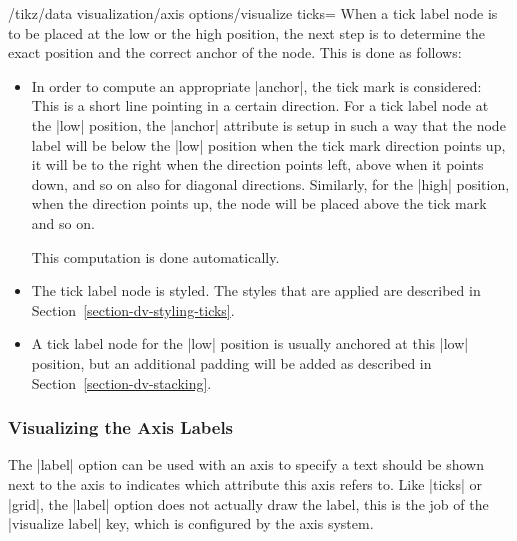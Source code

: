 \begin{key}{/tikz/data visualization/axis options/visualize ticks=}
    When a tick label node is to be placed at the low or the high position, the next step is to determine the exact position and the correct anchor of the node. This is done as follows:
    \begin{itemize}
        \item In order to compute an appropriate |anchor|, the tick mark is considered: This is a short line pointing in a certain direction. For a tick label node at the |low| position, the |anchor| attribute is setup in such a way that the node label will be below the |low| position when the tick mark direction points up, it will be to the right when the direction points left, above when it points down, and so on also for diagonal directions. Similarly, for the |high| position, when the direction points up, the node will be placed above the tick mark and so on.

            This computation is done automatically.
        \item The tick label node is styled. The styles that are applied are described in Section~\ref{section-dv-styling-ticks}.
        \item A tick label node for the |low| position is usually anchored at this |low| position, but an additional padding will be added as described in Section~\ref{section-dv-stacking}.
    \end{itemize}
\end{key}


\subsubsection{Visualizing the Axis Labels}
\label{section-dv-visualize-label}

The |label| option can be used with an axis to specify a text should be shown next to the axis to indicates which attribute this axis refers to. Like |ticks| or |grid|, the |label| option does not actually draw the label, this is the job of the |visualize label| key, which is configured by the axis system.

